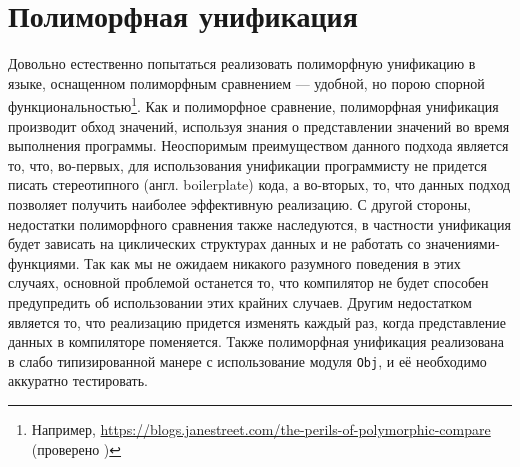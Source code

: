 
\section{Полиморфная унификация}
\label{sec:unification}

Довольно естественно попытаться реализовать полиморфную унификацию в языке, оснащенном полиморфным сравнением --- удобной, но порою спорной функциональностью\footnote{Например, \url{https://blogs.janestreet.com/the-perils-of-polymorphic-compare} (проверено )}.
Как и полиморфное сравнение, полиморфная унификация производит обход значений, используя знания о представлении значений во время выполнения программы.
Неоспоримым преимуществом данного подхода является то, что, во-первых, для использования унификации программисту не придется писать стереотипного (англ. boilerplate) кода, а во-вторых, то, что данных подход позволяет получить наиболее эффективную реализацию.
С другой стороны, недостатки полиморфного сравнения также наследуются, в частности унификация будет зависать на циклических структурах данных и не работать со значениями-функциями.
Так как мы не ожидаем никакого разумного поведения в этих случаях, основной проблемой останется то, что компилятор не будет способен предупредить об использовании этих крайних случаев.
Другим недостатком является то, что реализацию придется изменять каждый раз, когда представление данных в компиляторе поменяется.
Также полиморфная унификация реализована в слабо типизированной манере с использование модуля \lstinline|Obj|, и её необходимо аккуратно тестировать.


